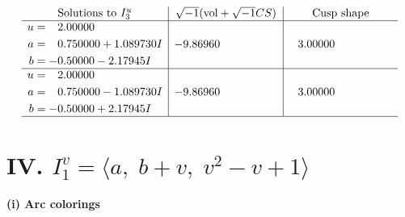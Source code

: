 \documentclass[1p]{elsarticle_modified}
\theoremstyle{definition}
\newcommand{\I}{\sqrt{-1}}
\begin{document}
$$\begin{array}{c|c|c}  
\text{Solutions to }I^u_{3}& \I (\text{vol} + \sqrt{-1}CS) & \text{Cusp shape}\\
 \hline 
\begin{aligned}
u &= \phantom{-}2.00000\phantom{ +0.000000I} \\
a &= \phantom{-}0.750000 + 1.089730 I \\
b &= -0.50000 - 2.17945 I\end{aligned}
 & -9.86960\phantom{ +0.000000I} & \phantom{-}3.00000\phantom{ +0.000000I} \\ \hline\begin{aligned}
u &= \phantom{-}2.00000\phantom{ +0.000000I} \\
a &= \phantom{-}0.750000 - 1.089730 I \\
b &= -0.50000 + 2.17945 I\end{aligned}
 & -9.86960\phantom{ +0.000000I} & \phantom{-}3.00000\phantom{ +0.000000I}\\
 \hline 
 \end{array}$$\newpage\newpage\renewcommand{\arraystretch}{1}
\centering \section*{IV. $I^v_{1}= \langle a,\;b+v,\;v^2- v+1 \rangle$}
\flushleft \textbf{(i) Arc colorings}\\
\end{document}
